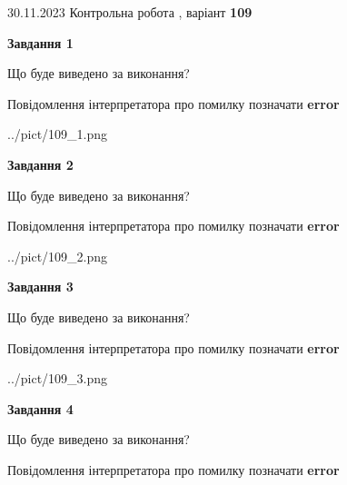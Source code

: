 \documentclass[12pt, ukrainian]{article}
\begin{document}
{{30.11.2023 Контрольна робота , варіант  \No \textbf { 109 }\par}}
{




{\begin {center}\textbf{Завдання 1}\end {center}}\par
Що буде виведено за виконання? \par
Повідомлення інтерпретатора про помилку позначати \textbf{error}

\begin{center}
	{../pict/109_1.png}
\end{center}
\newpage

{\begin {center}\textbf{Завдання 2}\end {center}}\par
Що буде виведено за виконання? \par
Повідомлення інтерпретатора про помилку позначати \textbf{error}

\begin{center}
	{../pict/109_2.png}
\end{center}
\newpage

{\begin {center}\textbf{Завдання 3}\end {center}}\par
Що буде виведено за виконання? \par
Повідомлення інтерпретатора про помилку позначати \textbf{error}

\begin{center}
	{../pict/109_3.png}
\end{center}
\newpage

{\begin {center}\textbf{Завдання 4}\end {center}}\par
Що буде виведено за виконання? \par
Повідомлення інтерпретатора про помилку позначати \textbf{error}

}
\end{document}
